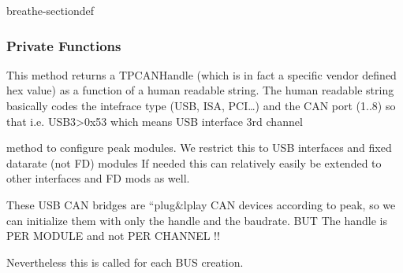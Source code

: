 \documentclass[a4paper,10pt,english]{sphinxmanual}
\begin{document}
\begin{fulllineitems}
%
\pysigstartmultiline
{}%
\pysigstopmultiline
\begin{sphinxuseclass}{breathe-sectiondef}\subsubsection*{Private Functions}


\begin{fulllineitems}
%
\pysigstartmultiline
{}%
\pysigstopmultiline
\sphinxAtStartPar
This method returns a TPCANHandle (which is in fact a specific vendor defined hex value) as a function of a human readable string. The human readable string basically codes the intefrace type (USB, ISA, PCI…) and the CAN port (1..8) so that i.e. USB3\sphinxhyphen{}\textgreater{}0x53 which means USB interface 3rd channel 

\end{fulllineitems}



\begin{fulllineitems}
%
\pysigstartmultiline
{}%
\pysigstopmultiline
\sphinxAtStartPar
method to configure peak modules. We restrict this to USB interfaces and fixed datarate (not FD) modules If needed this can relatively easily be extended to other interfaces and FD mods as well.

\sphinxAtStartPar
These USB CAN bridges are “plug\&lplay CAN devices according to peak, so we can initialize them with only the handle and the baudrate. BUT \sphinxhyphen{} The handle is PER MODULE and not PER CHANNEL !!

\sphinxAtStartPar
Nevertheless this is called for each BUS creation.


\end{fulllineitems}
\end{sphinxuseclass}
\end{fulllineitems}
\end{document}
